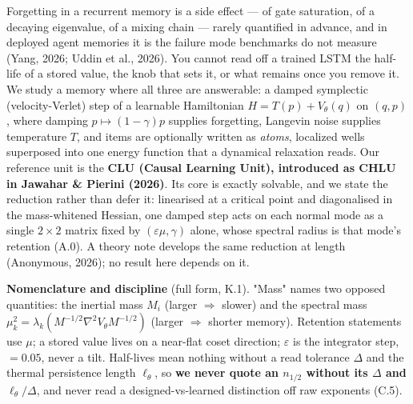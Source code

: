 \documentclass{article}
\begin{document}
Forgetting in a recurrent memory is a side effect --- of gate saturation, of a decaying eigenvalue, of a mixing chain --- rarely quantified in advance, and in deployed agent memories it is the failure mode benchmarks do not measure (Yang, 2026; Uddin et al., 2026). You cannot read off a trained LSTM the half-life of a stored value, the knob that sets it, or what remains once you remove it. We study a memory where all three are answerable: a damped symplectic (velocity-Verlet) step of a learnable Hamiltonian $H=T(p)+V_\theta(q)$ on $(q,p)$, where damping $p\mapsto(1-\gamma)p$ supplies forgetting, Langevin noise supplies temperature $T$, and items are optionally written as \emph{atoms}, localized wells superposed into one energy function that a dynamical relaxation reads. Our reference unit is the \textbf{CLU (Causal Learning Unit), introduced as CHLU in Jawahar \& Pierini (2026)}. Its core is exactly solvable, and we state the reduction rather than defer it: linearised at a critical point and diagonalised in the mass-whitened Hessian, one damped step acts on each normal mode as a single $2\times2$ matrix fixed by $(\varepsilon\mu,\gamma)$ alone, whose spectral radius is that mode's retention (A.0). A theory note develops the same reduction at length (Anonymous, 2026); no result here depends on it.

\textbf{Nomenclature and discipline} (full form, K.1). "Mass" names two opposed quantities: the inertial mass $M_i$ (larger $\Rightarrow$ slower) and the spectral mass $\mu_k^2=\lambda_k(M^{-1/2}\nabla^2V_\theta M^{-1/2})$ (larger $\Rightarrow$ shorter memory). Retention statements use $\mu$; a stored value lives on a near-flat coset direction; $\varepsilon$ is the integrator step, $=0.05$, never a tilt. Half-lives mean nothing without a read tolerance $\Delta$ and the thermal persistence length $\ell_\theta$, so \textbf{we never quote an $n_{1/2}$ without its $\Delta$ and $\ell_\theta/\Delta$}, and never read a designed-vs-learned distinction off raw exponents (C.5).
\end{document}
